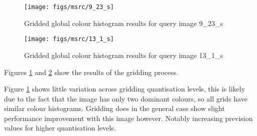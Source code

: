 \begin{figure}[ht]
	\begin{minipage}[]{0.3\linewidth}
		\centering
		\texttt{[image: figs/msrc/9\_23\_s]}
		\label{fig:grid-color-sheep-img}
	\end{minipage}
	\begin{minipage}[]{0.7\linewidth}
		\centering

		\prplotclose
		\label{fig:grid-color-sheep-graph}
	\end{minipage}
	\caption{Gridded global colour histogram results for query image 9\_23\_s}
	\label{fig:grid-color-sheep}
\end{figure}


\begin{figure}[ht]
	\begin{minipage}[]{0.3\linewidth}
		\centering
		\texttt{[image: figs/msrc/13\_1\_s]}
		\label{fig:grid-color-books-img}
	\end{minipage}
	\begin{minipage}[]{0.7\linewidth}
		\centering
		
		\prplotclose
		\label{fig:grid-color-books-graph}
	\end{minipage}
	\caption{Gridded global colour histogram results for query image 13\_1\_s}
	\label{fig:grid-color-books}
\end{figure}

Figures \ref{fig:grid-color-sheep} and \ref{fig:grid-color-books} show the results of the gridding process.

Figure \ref{fig:grid-color-sheep} shows little variation across gridding quantisation levels, this is likely due to the fact that the image has only two dominant colours, so all grids have similar colour histograms. Gridding does in the general case show slight performance improvement with this image however. Notably increasing prevision values for higher quantisation levels.

